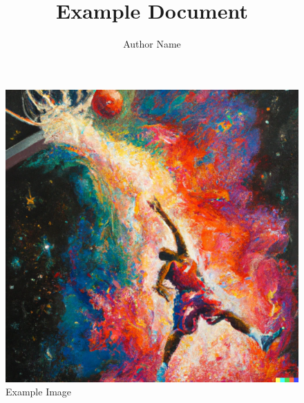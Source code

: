 \documentclass[a4paper, 11pt]{article}
\title{Example Document}
\author{Author Name}
\begin{document}
\maketitle

\begin{figure}[H]
    \centering
    \includegraphics[width=0.5\linewidth]{painting.png}
    \caption{Example Image}
    \label{fig:example-image}
\end{figure}

\tableofcontents
\listoffigures
\newpage



\newpage




\end{document}
